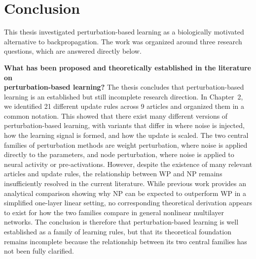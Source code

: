 \section{Conclusion}

This thesis investigated perturbation-based learning as a biologically motivated alternative to backpropagation. The work was organized around three research questions, which are answered directly below.

\textbf{What has been proposed and theoretically established in the literature on\\ perturbation-based learning?}  
The thesis concludes that perturbation-based learning is an established but still incomplete research direction. In Chapter~2, we identified 21 different update rules across 9 articles and organized them in a common notation. This showed that there exist many different versions of perturbation-based learning, with variants that differ in where noise is injected, how the learning signal is formed, and how the update is scaled. The two central families of perturbation methods are weight perturbation, where noise is applied directly to the parameters, and node perturbation, where noise is applied to neural activity or pre-activations. However, despite the existence of many relevant articles and update rules, the relationship between WP and NP remains insufficiently resolved in the current literature. While previous work provides an analytical comparison showing why NP can be expected to outperform WP in a simplified one-layer linear setting, no corresponding theoretical derivation appears to exist for how the two families compare in general nonlinear multilayer networks. The conclusion is therefore that perturbation-based learning is well established as a family of learning rules, but that its theoretical foundation remains incomplete because the relationship between its two central families has not been fully clarified.

